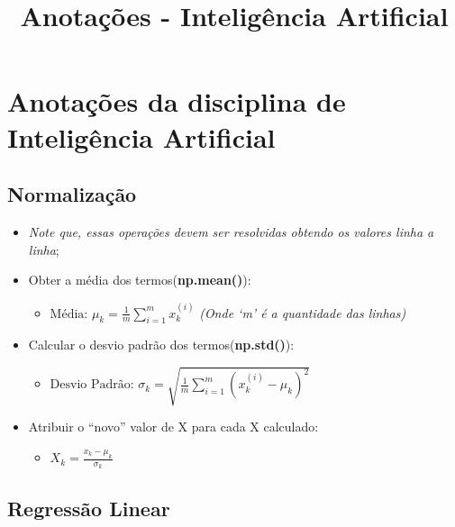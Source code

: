 \documentclass[12pt]{article}
\title{Anotações - Inteligência Artificial}
\providecommand{\tightlist}{%
      \setlength{\itemsep}{0pt}\setlength{\parskip}{0pt}}
\begin{document}
    \hypertarget{anotauxe7uxf5es-da-disciplina-de-inteliguxeancia-artificial}{%
\section{\texorpdfstring{\textbf{Anotações da disciplina de Inteligência
Artificial}}{Anotações da disciplina de Inteligência Artificial}}\label{anotauxe7uxf5es-da-disciplina-de-inteliguxeancia-artificial}}

    \hypertarget{normalizauxe7uxe3o}{%
\subsection{\texorpdfstring{\textbf{Normalização}}{Normalização}}\label{normalizauxe7uxe3o}}

\begin{itemize}
\tightlist
\item
  \emph{Note que, essas operações devem ser resolvidas obtendo os
  valores linha a linha};
\item
  Obter a média dos termos(\textbf{np.mean()}):

  \begin{itemize}
  \tightlist
  \item
    \(\text{Média: }\mu_k=\frac{1}{m}\sum\limits_{i=1}^{m}x_k^{(i)}\)
    \emph{(Onde `m' é a quantidade das linhas)}
  \end{itemize}
\item
  Calcular o desvio padrão dos termos(\textbf{np.std()}):

  \begin{itemize}
  \tightlist
  \item
    \(\text{Desvio Padrão: }\sigma_k=\sqrt{\frac{1}{m}\sum\limits_{i=1}^{m}(x_k^{(i)}-\mu_k)^2}\)
  \end{itemize}
\item
  Atribuir o ``novo'' valor de X para cada X calculado:

  \begin{itemize}
  \tightlist
  \item
    \(X_k=\frac{x_k-\mu_k}{\sigma_k}\)
  \end{itemize}
\end{itemize}

    \hypertarget{regressuxe3o-linear}{%
\subsection{\texorpdfstring{\textbf{Regressão
Linear}}{Regressão Linear}}\label{regressuxe3o-linear}}
\end{document}
